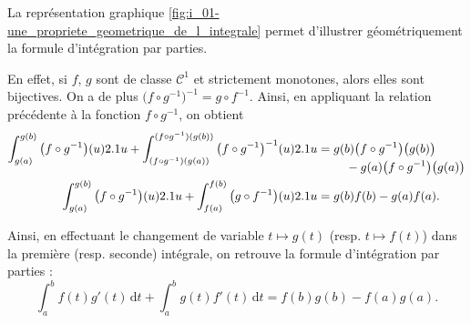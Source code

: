 \begin{remarque}
La représentation graphique \ref{fig:i_01-une_propriete_geometrique_de_l_integrale} permet d'illustrer géométriquement la formule d'intégration par parties.

En effet, si $f$, $g$ sont de classe $\mathcal{C}^1$ et strictement monotones, alors elles sont bijectives. On a de plus \mbox{$\big(f \circ g^{-1}\big)^{-1} = g \circ f^{-1}$}. Ainsi, en appliquant la relation précédente à la fonction $f \circ g^{-1}$, on obtient
\begin{align*}
\int_{g(a)}^{g(b)} \big(f \circ g^{-1}\big)(u) \d u + \int_{(f\circ g^{-1})(g(a))}^{(f\circ g^{-1})(g(b))} \big(f \circ g^{-1}\big)^{-1}(u) \d u &= \begin{multlined}[t] 
g(b) \big(f \circ g^{-1}\big)\big(g(b)\big) \\
- g(a) \big(f \circ g^{-1}\big)\big(g(a)\big)
\end{multlined} \\
\int_{g(a)}^{g(b)} \big(f \circ g^{-1}\big)(u) \d u + \int_{f(a)}^{f(b)} \big(g \circ f^{-1}\big)(u) \d u
&= g(b) f(b) - g(a) f(a).
\end{align*}

Ainsi, en effectuant le changement de variable $t \mapsto g(t)$ (resp. $t \mapsto f(t)$) dans la première (resp. seconde) intégrale, on retrouve la formule d'intégration par parties :
\[
\int_a^b f(t) g'(t) \,\mathrm{d}t + \int_a^b g(t) f'(t) \,\mathrm{d}t = f(b) g(b) - f(a) g(a).
\]
\end{remarque}
